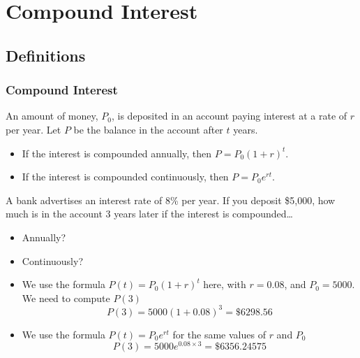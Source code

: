 \documentclass[9pt,xcolor=x11names,compress]{beamer}
\begin{document}
\section{Compound Interest}
\subsection{Definitions}
\begin{frame}\frametitle{Compound Interest}
An amount of money, $P_0$, is deposited in an account paying interest at a rate of $r$ per year.  Let $P$ be the balance in the account after $t$ years.  
\begin{itemize}
  \item If the interest is \alert{compounded annually}, then $P=P_0(1+r)^t$.
  \item If the interest is \alert{compounded continuously}, then $P=P_0e^{rt}$.
\end{itemize}
\pause
\begin{example}
  A bank advertises an interest rate of 8\% per year.  If you deposit \$5,000, how much is in the account 3 years later if the interest is compounded\dots
  \begin{itemize}
    \item \alert<3>{Annually?}
    \item \alert<4>{Continuously?}
  \end{itemize}
\end{example}
\begin{itemize}
  \item<3-> We use the formula $P(t)=P_0(1+r)^t$ here, with $r=0.08$, and $P_0=5000$.  We need to compute $P(3)$
  \begin{equation*}
    P(3) = 5000(1+0.08)^3= \$ 6298.56
  \end{equation*}
  \item<4-> We use the formula $P(t)=P_0e^{rt}$ for the same values of $r$ and $P_0$
  \begin{equation*}
    P(3)=5000e^{0.08 \times 3} = \$ 6356.24575
  \end{equation*}
\end{itemize}
\end{frame}
\end{document}

